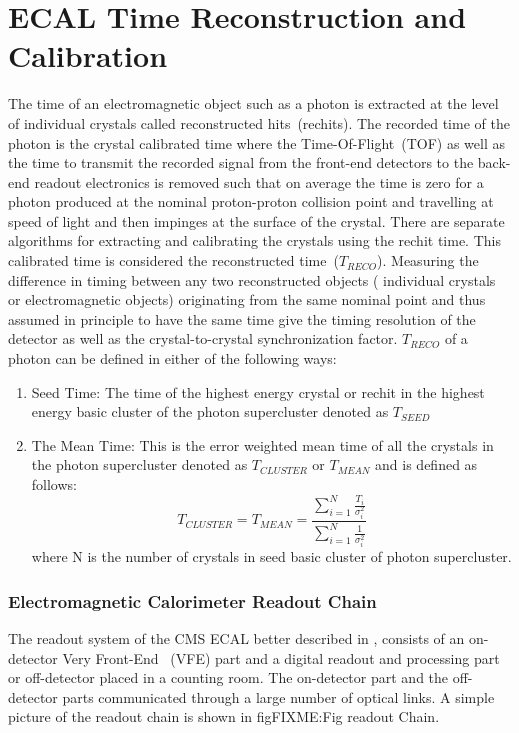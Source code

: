 \chapter{ECAL Time Reconstruction and Calibration}
The time of an electromagnetic object such as a photon is extracted at the level of individual crystals called reconstructed hits~(rechits). The recorded time of the photon is the crystal calibrated time where the Time-Of-Flight~(TOF) as well as the time to transmit the recorded signal from the front-end detectors to the back-end readout electronics is removed such that on average the time is zero for a photon produced at the nominal proton-proton collision point and travelling at speed of light and then impinges at the surface of the crystal.  There are separate algorithms for extracting and calibrating the crystals using the rechit time. This calibrated time is considered the reconstructed time~($T_{RECO}$). 
Measuring the difference in timing between any two reconstructed objects ( individual crystals or electromagnetic objects) originating from the same nominal point and thus assumed in principle to have the same time give the timing resolution of the detector as well as the crystal-to-crystal synchronization factor.  $T_{RECO}$ of a photon can be defined in either of the following ways:
\begin{enumerate}
\item Seed Time: The time of the highest energy crystal or rechit in the highest energy basic cluster of the photon supercluster denoted as $T_{SEED}$
\item The Mean Time: This is the error weighted mean time of all the crystals in the photon supercluster denoted as $T_{CLUSTER}$ or $T_{MEAN}$ and is defined as follows:
\begin{equation}
T_{CLUSTER} = T_{MEAN} = \frac{\sum_{i=1}^N\frac{T_{i}}{\sigma_{i}^{2}}}{\sum_{i=1}^{N}\frac{1}{\sigma_{i}^{2}}} 
\end{equation}
\newline
 where N is the number of crystals in seed basic cluster of photon supercluster. 

\end{enumerate}
\subsection{Electromagnetic Calorimeter Readout Chain}
The readout system of the CMS ECAL better described in \cite{ECALREADOUT}, consists of an on-detector Very Front-End ~(VFE) part and a digital readout and processing part or off-detector placed in a counting room. The on-detector part and the off-detector parts communicated through a large number of optical links. A simple picture of the readout chain is shown in fig{FIXME:Fig readout Chain}.

